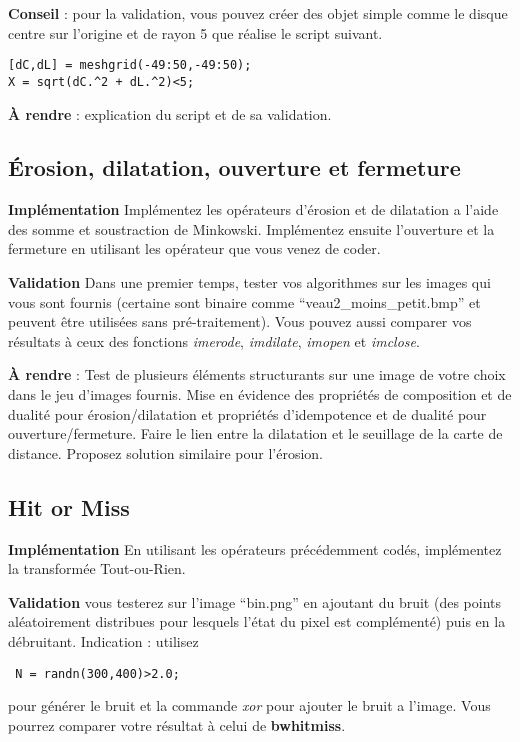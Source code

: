 \documentclass[10pt,a4paper]{article}
\begin{document}
\noindent\textbf{Conseil} : pour la validation, vous pouvez cr\'{e}er des objet simple comme le disque centre sur l'origine et de rayon 5 que r\'{e}alise le script suivant.
\begin{verbatim}
[dC,dL] = meshgrid(-49:50,-49:50);
X = sqrt(dC.^2 + dL.^2)<5;
\end{verbatim}

\noindent\textbf{\`{A} rendre} : explication du script et de sa validation.


\subsection{\'{E}rosion, dilatation, ouverture et fermeture}
\textbf{Impl\'{e}mentation} Impl\'{e}mentez les op\'{e}rateurs d'\'{e}rosion et de dilatation a l'aide des somme et soustraction de Minkowski. Impl\'{e}mentez ensuite l'ouverture et la fermeture en utilisant les op\'{e}rateur que vous venez de coder.

\noindent\textbf{Validation} Dans une premier temps, tester vos algorithmes sur les images qui vous sont fournis (certaine sont binaire comme ``veau2\_moins\_petit.bmp'' et peuvent \^{e}tre utilis\'{e}es sans pr\'{e}-traitement). Vous pouvez aussi comparer vos r\'{e}sultats \`{a} ceux des fonctions \textit{imerode}, \textit{imdilate}, \textit{imopen} et \textit{imclose}.

\noindent\textbf{\`{A} rendre} : Test de plusieurs \'{e}l\'{e}ments structurants sur une image de votre choix dans le jeu d'images fournis. Mise en \'{e}vidence des propri\'{e}t\'{e}s de composition et de dualit\'{e} pour \'{e}rosion/dilatation et propri\'{e}t\'{e}s d'idempotence et de dualit\'{e} pour  ouverture/fermeture. Faire le lien entre la dilatation et le seuillage de la carte de distance. Proposez solution similaire pour l'\'{e}rosion.

\subsection{Hit or Miss}
\textbf{Impl\'{e}mentation} En utilisant les op\'{e}rateurs pr\'{e}c\'{e}demment cod\'{e}s, impl\'{e}mentez la transform\'{e}e Tout-ou-Rien.

\noindent\textbf{Validation} vous testerez sur l'image ``bin.png'' en ajoutant du bruit (des points al\'{e}atoirement distribues pour lesquels l'\'{e}tat du pixel est compl\'{e}ment\'{e}) puis en la d\'{e}bruitant. Indication : utilisez \begin{verbatim} N = randn(300,400)>2.0;\end{verbatim} pour g\'{e}n\'{e}rer le bruit et la commande \textit{xor} pour ajouter le bruit a l'image. Vous pourrez comparer votre r\'{e}sultat \`{a} celui de \textbf{bwhitmiss}.
\end{document}
